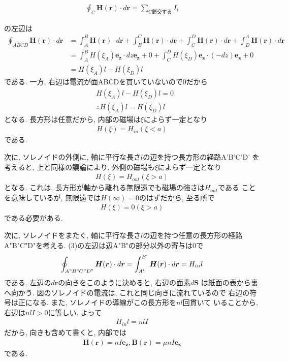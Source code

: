 \documentclass[a4paper,12pt]{jlreq}
\begin{document}
\begin{align}
  \oint_C \bm{H}(\bm{r}) \cdot d \bm{r} = \sum_{\text{C鎖交する}}^{} I_i
\end{align}

の左辺は
\begin{align}
  \oint_{ABCD} \bm{H}(\bm{r}) \cdot d \bm{r} &= \int_{A}^{B} \bm{H}(\bm{r}) \cdot d \bm{r} + \int_{B}^{C} \bm{H}(\bm{r}) \cdot d \bm{r} + \int_{C}^{D} \bm{H}(\bm{r}) \cdot d \bm{r} + \int_{D}^{A} \bm{H}(\bm{r}) \cdot d \bm{r} \\
  &= \int_{A}^{B} H(\xi_A) \bm{e_z} \cdot dz \bm{e_z} + 0 + \int_{C}^{D} H(\xi_D) \bm{e_z} \cdot (-dz)\bm{e_z} + 0 \\
  &= H(\xi_A) l - H(\xi_D) l
\end{align}
である. 一方, 右辺は電流が面ABCDを貫いていないので0だから
\begin{align}
  &H(\xi_A)l - H(\xi_D)l = 0\\
  &\therefore　 H(\xi_A)l = H(\xi_D)l
\end{align}
となる. 長方形は任意だから, 内部の磁場は$\xi$によらず一定となり
\begin{align}
  H(\xi) = H_{in}　(\xi < a)
\end{align}
である. \par

次に, ソレノイドの外側に, 軸に平行な長さ$l$の辺を持つ長方形の経路A'B'C'D'
を考えると, 上と同様の議論により, 外側の磁場も$\xi$によらず一定となり
\begin{align}
  H(\xi) = H_{out}　(\xi > a)
\end{align}
となる. これは, 長方形が軸から離れる無限遠でも磁場の強さは$H_{out}$である
ことを意味しているが, 無限遠では$H(\infty) = 0$のはずだから, 至る所で
\begin{align}
  H(\xi) = 0　(\xi > a)
\end{align}
である必要がある. \par

次に, ソレノイドをまたぐ, 軸に平行な長さ$l$の辺を持つ任意の長方形の経路
A"B"C"D"を考える. (3)の左辺は辺A"B"の部分以外の寄与は0で
\begin{align}
  \oint_{A"B"C"D"} \bm{H}(\bm{r}) \cdot d \bm{r} = \int_{A'}^{B'}  \bm{H}(\bm{r}) \cdot d \bm{r} = H_{in} l
\end{align}
である. 左辺の$d\bm{r}$の向きをこのように決めると, 右辺の面素$d\bm{S}$
は紙面の表から裏へ向かう. 図のソレノイドの電流は, これと同じ向きに流れているので
右辺の符号は正になる. また, ソレノイドの導線がこの長方形を$nl$回貫いて
いることから, 右辺は$nlI>0$に等しい. よって
\begin{align}
  H_{in}l = nlI
\end{align}
だから, 向きも含めて書くと, 内部では
\begin{align}
  \bm{H}(\bm{r}) = nI\bm{e_z},　\bm{B}(\bm{r}) = \mu nI\bm{e_z}
\end{align}
である. 
\end{document}
